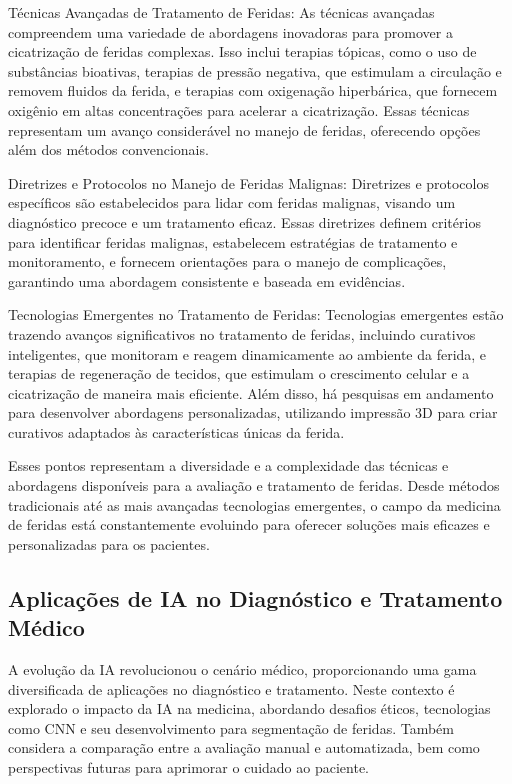 Técnicas Avançadas de Tratamento de Feridas: As técnicas avançadas compreendem uma variedade de abordagens inovadoras para promover a cicatrização de feridas complexas. Isso inclui terapias tópicas, como o uso de substâncias bioativas, terapias de pressão negativa, que estimulam a circulação e removem fluidos da ferida, e terapias com oxigenação hiperbárica, que fornecem oxigênio em altas concentrações para acelerar a cicatrização. Essas técnicas representam um avanço considerável no manejo de feridas, oferecendo opções além dos métodos convencionais.

Diretrizes e Protocolos no Manejo de Feridas Malignas: Diretrizes e protocolos específicos são estabelecidos para lidar com feridas malignas, visando um diagnóstico precoce e um tratamento eficaz. Essas diretrizes definem critérios para identificar feridas malignas, estabelecem estratégias de tratamento e monitoramento, e fornecem orientações para o manejo de complicações, garantindo uma abordagem consistente e baseada em evidências.

Tecnologias Emergentes no Tratamento de Feridas: Tecnologias emergentes estão trazendo avanços significativos no tratamento de feridas, incluindo curativos inteligentes, que monitoram e reagem dinamicamente ao ambiente da ferida, e terapias de regeneração de tecidos, que estimulam o crescimento celular e a cicatrização de maneira mais eficiente. Além disso, há pesquisas em andamento para desenvolver abordagens personalizadas, utilizando impressão 3D para criar curativos adaptados às características únicas da ferida.

Esses pontos representam a diversidade e a complexidade das técnicas e abordagens disponíveis para a avaliação e tratamento de feridas. Desde métodos tradicionais até as mais avançadas tecnologias emergentes, o campo da medicina de feridas está constantemente evoluindo para oferecer soluções mais eficazes e personalizadas para os pacientes.

\subsection{Aplicações de IA no Diagnóstico e Tratamento Médico}

A evolução da \ac{IA} revolucionou o cenário médico, proporcionando uma gama diversificada de aplicações no diagnóstico e tratamento. Neste contexto é explorado o impacto da \ac{IA} na medicina, abordando desafios éticos, tecnologias como \ac{CNN} e seu desenvolvimento para segmentação de feridas. Também considera a comparação entre a avaliação manual e automatizada, bem como perspectivas futuras para aprimorar o cuidado ao paciente.


